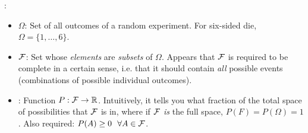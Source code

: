 \documentclass[12pt]{article}
\newcommand\p{\Needspace{10\baselineskip} \noindent}
\begin{document}
%


\label{Concept Summaries}



\p {}:\vspace{-1em}
\begin{itemize}[--]
	\item {} $\Omega$: Set of all outcomes of a random experiment. For six-sided die, $\Omega = \{1, \ldots, 6\}$. 
	\item {} $\mathcal{F}$: Set whose \textit{elements} are \textit{subsets} of $\Omega$. Appears that $\mathcal{F}$ is required to be complete in a certain sense, i.e. that it should contain \textit{all} possible events (combinations of possible individual outcomes). 
	\item {}: Function $P : \mathcal{F} \rightarrow \mathbb{R}$. Intuitively, it tells you what fraction of the total space of possibilities that $\mathcal{F}$ is in, where if $\mathcal{F}$ \textit{is} the full space, $P(F) = P(\Omega) = 1$. Also required: $P(A) \ge 0 ~~ \forall A \in \mathcal{F}$. 
\end{itemize}
\end{document}
